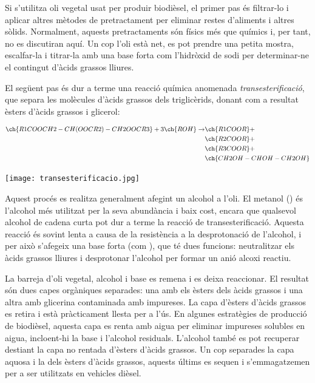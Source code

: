 Si s'utilitza oli vegetal usat per produir biodièsel, el primer pas és filtrar-lo i aplicar altres mètodes de pretractament per eliminar restes d'aliments i altres sòlids. Normalment, aquests pretractaments són físics més que químics i, per tant, no es discutiran aquí. Un cop l'oli està net, es pot prendre una petita mostra, escalfar-la i titrar-la amb una base forta com l'hidròxid de sodi per determinar-ne el contingut d'àcids grassos lliures\cite{noauthor_115_2023}.

El següent pas és dur a terme una reacció química anomenada \textit{transesterificació}, que separa les molècules d'àcids grassos dels triglicèrids, donant com a resultat èsters d'àcids grassos i glicerol\cite{noauthor_82_nodate}:

\begin{align*}
\ch{R1COOCH2-CH(OOCR2)-CH2OOCR3} + 3 \ch{ROH} \rightarrow & \ch{R1COOR} + \\&\ch{R2COOR} + \\&\ch{R3COOR} + \\&\ch{CH2OH-CHOH-CH2OH}
\end{align*}

\begin{center}
    \texttt{[image: transesterificacio.jpg]}
\end{center}

Aquest procés es realitza generalment afegint un alcohol a l'oli. El metanol () és l'alcohol més utilitzat per la seva abundància i baix cost, encara que qualsevol alcohol de cadena curta pot dur a terme la reacció de transesterificació. Aquesta reacció és sovint lenta a causa de la resistència a la desprotonació de l'alcohol, i per això s'afegeix una base forta (com ), que té dues funcions: neutralitzar els àcids grassos lliures i desprotonar l'alcohol per formar un anió alcoxi reactiu.

La barreja d'oli vegetal, alcohol i base es remena i es deixa reaccionar. El resultat són dues capes orgàniques separades: una amb els èsters dels àcids grassos i una altra amb glicerina contaminada amb impureses. La capa d'èsters d'àcids grassos es retira i està pràcticament llesta per a l'ús. En algunes estratègies de producció de biodièsel, aquesta capa es renta amb aigua per eliminar impureses solubles en aigua, incloent-hi la base i l'alcohol residuals. L'alcohol també es pot recuperar desti\lgem ant la capa no rentada d'èsters d'àcids grassos. Un cop separades la capa aquosa i la dels èsters d'àcids grassos, aquests últims es sequen i s'emmagatzemen per a ser utilitzats en vehicles dièsel.

